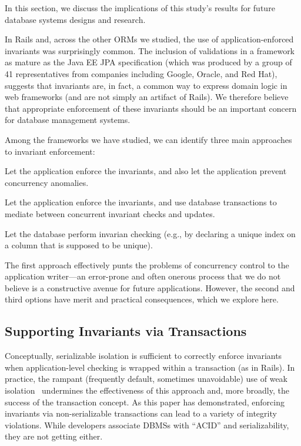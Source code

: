 In this section, we discuss the implications of this study's results
for future database systems designs and research.

In Rails and, across the other ORMs we studied, the use of
application-enforced invariants was surprisingly common. The
inclusion of validations in a framework as mature as the Java EE JPA
specification (which was produced by a group of 41 representatives
from companies including Google, Oracle, and Red Hat), suggests that
invariants are, in fact, a common way to express domain logic in web
frameworks (and are not simply an artifact of Rails). We therefore
believe that appropriate enforcement of these invariants should be an
important concern for database management systems.

Among the frameworks we have studied, we can identify three main
approaches to invariant enforcement:
\begin{defendenumerate}
\item Let the application enforce the invariants, and also let
  the application prevent concurrency anomalies.

\item Let the application enforce the invariants, and use database
  transactions to mediate between concurrent invariant checks and updates.

\item Let the database perform invarian checking (e.g., by declaring a
  unique index on a column that is supposed to be unique).
\end{defendenumerate}

The first approach effectively punts the problems of concurrency
control to the application writer---an error-prone and often onerous
process that we do not believe is a constructive avenue for future
applications. However, the second and third options have merit and practical
consequences, which we explore here.

\subsection{Supporting Invariants via Transactions}

Conceptually, serializable
isolation is sufficient to correctly enforce invariants when
application-level checking is wrapped within a transaction (as in
Rails). In practice, the rampant (frequently default, sometimes
unavoidable) use of weak isolation~\cite{hat-vldb} undermines the
effectiveness of this approach and, more broadly, the success of the
transaction concept. As this paper has demonstrated, enforcing invariants via
non-serializable transactions can lead to a variety of integrity
violations. While developers associate DBMSs with ``ACID'' and
serializability, they are not getting either.

